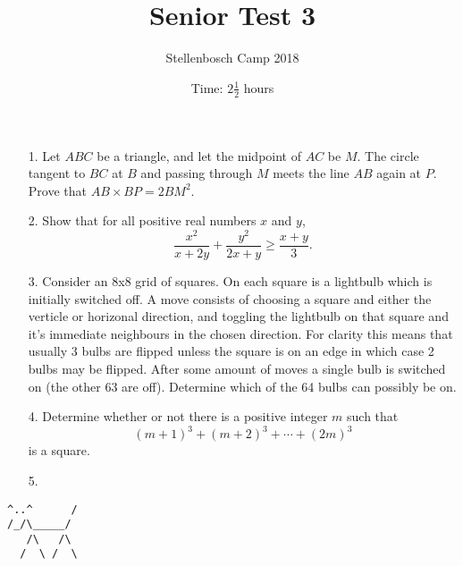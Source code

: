 \documentclass[a4paper, 11pt]{article}
\title{Senior Test 3}
\author{Stellenbosch Camp 2018}
\date{Time: $2 \frac{1}{2}$ hours}
\begin{document}
 \maketitle

\begin{enumerate}

\item[1.] Let $ABC$ be a triangle, and let the midpoint of $AC$ be $M$. The circle tangent to $BC$ at $B$ and passing through $M$ meets the line $AB$ again at $P$. Prove that $AB \times BP = 2 BM^2$.


\vspace{6pt}
\item[2.]
Show that for all positive real numbers $x$ and $y$, \[ \frac{x^2}{x+2y} +\frac{y^2}{2x+y} \geq \frac{x+y}{3}. \]


\item[3.]
Consider an 8x8 grid of squares. On each square is a lightbulb which is initially switched off. A move consists of choosing a square and either the verticle or horizonal direction, and toggling the lightbulb on that square and it's immediate neighbours in the chosen direction. For clarity this means that usually 3 bulbs are flipped unless the square is on an edge in which case 2 bulbs may be flipped. After some amount of moves a single bulb is switched on (the other 63 are off). Determine which of the 64 bulbs can possibly be on. 


\vspace{6pt}
\item[4.]
Determine whether or not there is a positive integer $m$ such that \[ (m+1)^3 +(m+2)^3 +\dotsb +(2m)^3 \] is a square.


\vspace{6pt}
% 
\item[5.]


\end{enumerate}

\vfill

\centering
\begin{BVerbatim}
^..^      /
/_/\_____/
   /\   /\
  /  \ /  \
\end{BVerbatim}
\end{document}
